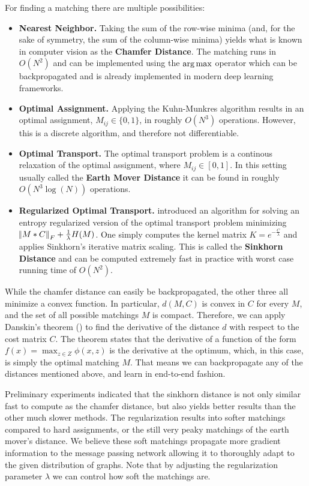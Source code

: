 For finding a matching there are multiple possibilities:
\begin{itemize}
     \itemsep0em
     \item \textbf{Nearest Neighbor.} Taking the sum of the row-wise minima (and, for the sake of symmetry, the sum of the column-wise minima) yields what is known in computer vision as the \textbf{Chamfer Distance}. The matching runs in $O(N^2)$ and can be implemented using the $\operatorname*{arg\,max}$ operator which can be backpropagated and is already implemented in modern deep learning frameworks.
     \item \textbf{Optimal Assignment.} Applying the Kuhn-Munkres algorithm results in an optimal assignment, $M_{ij} \in \{0,1\}$, in roughly $O(N^3)$ operations. However, this is a discrete algorithm, and therefore not differentiable.
     \item \textbf{Optimal Transport.} The optimal transport problem is a continous relaxation of the optimal assignment, where $M_{ij} \in \left[ 0,1 \right]$. In this setting usually called the \textbf{Earth Mover Distance} it can be found in roughly $O(N^3 \log(N))$ operations.
     \item \textbf{Regularized Optimal Transport.} \cite{sinkhorn2013} introduced an algorithm for solving an entropy regularized version of the optimal transport problem minimizing $\norm{M * C}_F + \frac{1}{\lambda} H(M)$. One simply computes the kernel matrix $ K = e^{ -\frac{C}{\lambda}}$ and applies Sinkhorn’s iterative matrix scaling. This is called the \textbf{Sinkhorn Distance} and can be computed extremely fast in practice with worst case running time of $O(N^2)$.
\end{itemize}
While the chamfer distance can easily be backpropagated, the other three all minimize a convex function. In particular, $d(M,C)$ is convex in $C$ for every $M$, and the set of all possible matchings $M$ is compact. Therefore, we can apply Danskin's theorem (\citealp{danskin1967}) to find the derivative of the distance $d$ with respect to the cost matrix $C$. The theorem states that the derivative of a function of the form $f(x) = \max_{z \in Z} \phi(x,z)$ is the derivative at the optimum, which, in this case, is simply the optimal matching $M$. That means we can backpropagate any of the distances mentioned above, and learn in end-to-end fashion.

Preliminary experiments indicated that the sinkhorn distance is not only similar fast to compute as the chamfer distance, but also yields better results than the other much slower methods. The regularization results into softer matchings compared to hard assignments, or the still very peaky matchings of the earth mover's distance. We believe these soft matchings propagate more gradient information to the message passing network allowing it to thoroughly adapt to the given distribution of graphs. Note that by adjusting the regularization parameter $\lambda$ we can control how soft the matchings are.

